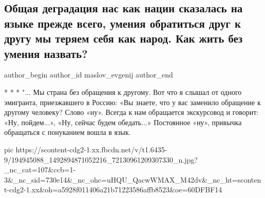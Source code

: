  
 
 
 
 
 
\subsection{Общая деградация нас как нации сказалась на языке прежде всего, умения обратиться друг к другу мы теряем себя как народ. Как жить без умения назвать?}
\label{sec:03_06_2021.fb.maslov_evgenij.1.degradacia_nacia_slovo}
\ifcmt
 author_begin
   author_id maslov_evgenij
 author_end
\fi

* * *
"... Мы страна без обращения к другому. Вот что я слышал от одного эмигранта, приезжавшего в Россию: «Вы знаете, что у вас заменило обращение к другому человеку? Слово «ну». Всегда к нам обращается экскурсовод и говорит: «Ну, пойдем...», «Ну, сейчас будем обедать...» Постоянное «ну», привычка обращаться с понуканием вошла в язык.

\ifcmt
  pic https://scontent-cdg2-1.xx.fbcdn.net/v/t1.6435-9/194945088_1492894871052216_72130961209307330_n.jpg?_nc_cat=107&ccb=1-3&_nc_sid=730e14&_nc_ohc=uHQU_QacwWMAX_M42dv&_nc_ht=scontent-cdg2-1.xx&oh=a5928f011406a21b71223586affb8523&oe=60DFBF14
\fi

